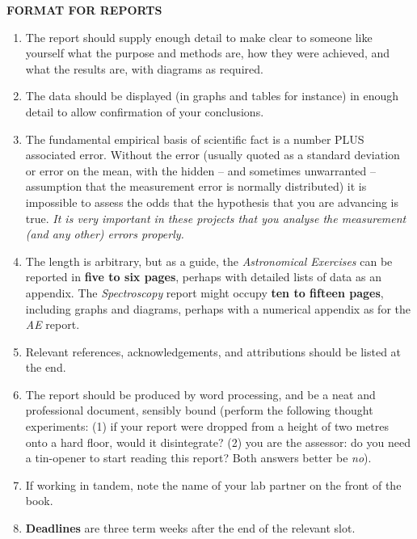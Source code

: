 \documentclass[12pt]{article}
\begin{document}
\begin{center}
{\bf FORMAT FOR REPORTS}
\end{center}
\begin{enumerate}
\item The report should supply enough detail to make clear to someone like yourself what the purpose and methods are, how they were achieved, and what the results are, with diagrams as required. 

\item The data should be displayed (in graphs and tables for instance) in enough detail to allow confirmation of your conclusions.

\item The fundamental empirical basis of scientific fact is a number PLUS associated error. Without the error (usually quoted as a standard deviation or error on the mean, with the hidden -- and sometimes unwarranted -- assumption that the measurement error is normally distributed) it is impossible to assess the odds that the hypothesis that you are advancing is true. {\sl It is very important in these projects that you analyse the measurement (and any other) errors properly.}

\item The length is arbitrary, but as a guide, the {\sl Astronomical Exercises} can be reported in {\bf five to six pages}, perhaps with detailed lists of data as an appendix. The {\sl Spectroscopy} report might occupy {\bf ten to fifteen pages}, including graphs and diagrams, perhaps with a numerical appendix as for the {\sl AE} report.

\item Relevant references, acknowledgements, and attributions should be listed at the end.

\item The report should be produced by word processing, and be a neat and professional document, sensibly bound (perform the following thought experiments: (1) if your report were dropped from a height of two metres onto a hard floor, would it disintegrate? (2) you are the assessor: do you need a tin-opener to start reading this report? Both answers better be {\sl no}).

\item If working in tandem, note the name of your lab partner on the front of the book.

\item {\bf Deadlines} are three term weeks after the end of the relevant slot.

\end{enumerate}
\end{document}
